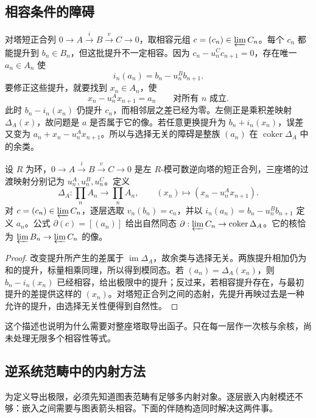 \subsection{相容条件的障碍}
\label{b4:subsec:1302:02}

对塔短正合列 \(0\to A\xrightarrow{i}B\xrightarrow{v}C\to0\)，取相容元组 \(c=(c_n)\in\varprojlim C_n\)。每个 \(c_n\) 都能提升到 \(b_n\in B_n\)，但这批提升不一定相容。因为 \(c_n-u_n^Cc_{n+1}=0\)，存在唯一 \(a_n\in A_n\) 使
\[
	i_n(a_n)=b_n-u_n^Bb_{n+1}.
\]
要修正这些提升，就要找到 \(x_n\in A_n\)，使
\[
	x_n-u_n^Ax_{n+1}=a_n\qquad\text{对所有 }n\text{ 成立}.
\]
此时 \(b_n-i_n(x_n)\) 仍提升 \(c_n\)，而相邻层之差已经为零。左侧正是乘积差映射 \(\Delta_A(x)\)，故问题是 \(a\) 是否属于它的像。若任意更换提升为 \(b_n+i_n(x_n)\)，误差又变为 \(a_n+x_n-u_n^Ax_{n+1}\)。所以与选择无关的障碍是整族 \((a_n)\) 在 \(\operatorname{coker}\Delta_A\) 中的余类。

\begin{proposition}\label{b4:prop:compatible-lift-obstruction}
	设 \(R\) 为环，\(0\to A\xrightarrow{i}B\xrightarrow{v}C\to0\) 是左 \(R\)-模可数逆向塔的短正合列，三座塔的过渡映射分别记为 \(u_n^A,u_n^B,u_n^C\)。定义
	\[
		\Delta_A:\prod_nA_n\longrightarrow\prod_nA_n, \qquad (x_n)\longmapsto(x_n-u_n^Ax_{n+1}).
	\]
	对 \(c=(c_n)\in\varprojlim C_n\)，逐层选取 \(v_n(b_n)=c_n\)，并以 \(i_n(a_n)=b_n-u_n^Bb_{n+1}\) 定义 \(a_n\)。公式 \(\partial(c)=[(a_n)]\) 给出自然同态 \(\partial:\varprojlim C_n\to\operatorname{coker}\Delta_A\)。它的核恰为 \(\varprojlim B_n\to\varprojlim C_n\) 的像。
\end{proposition}
\begin{proof}
	改变提升所产生的差属于 \(\operatorname{im}\Delta_A\)，故余类与选择无关。两族提升相加仍为和的提升，标量相乘同理，所以得到模同态。若 \((a_n)=\Delta_A(x_n)\)，则 \(b_n-i_n(x_n)\) 已经相容，给出极限中的提升；反过来，若相容提升存在，与最初提升的差提供这样的 \((x_n)\)。对塔短正合列之间的态射，先提升再映过去是一种允许的提升，由选择无关性便得到自然性。
\end{proof}

这个描述也说明为什么需要对整座塔取导出函子。只在每一层作一次核与余核，尚未处理无限多个相容性等式。

\subsection{逆系统范畴中的内射方法}
\label{b4:subsec:1302:03}

为定义导出极限，必须先知道图表范畴有足够多内射对象。逐层嵌入内射模还不够：嵌入之间需要与图表箭头相容。下面的伴随构造同时解决这两件事。

